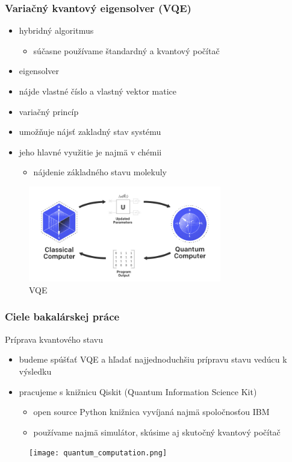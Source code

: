 \documentclass{beamer}
\begin{document}
\begin{frame}
	\frametitle{Variačný kvantový eigensolver (VQE)}
	\begin{itemize}
		\item hybridný algoritmus
		      \begin {itemize}
		\item súčasne používame štandardný a kvantový počítač
	\end{itemize}
	\item eigensolver
	\item 	\begin{itemize}
	nájde vlastné číslo a vlastný vektor matice
	\end{itemize}
	\item variačný princíp
	\item \begin{itemize}
	umožňuje nájsť zakladný stav systému
	\end{itemize}
	\item jeho hlavné využitie je najmä v chémii
	\begin{itemize} 
		\item nájdenie základného stavu molekuly
	\end{itemize}
	\end{itemize}
			
	\begin{figure}
		\centering
		\includegraphics[width=0.75\textwidth]{vqe.jpeg}
		\caption{VQE}
						            
	\end{figure}
\end{frame}


\begin{frame}
	\frametitle{Ciele bakalárskej práce}
	Príprava kvantového stavu
	\begin{itemize}
		\item budeme spúšťať VQE a hľadať najjednoduchšiu prípravu stavu vedúcu k výsledku
		\item pracujeme s knižnicu Qiskit (Quantum Information Science Kit)
		      \begin{itemize}
		      	\item open source Python knižnica vyvíjaná najmä spoločnosťou IBM
		      	\item používame najmä simulátor, skúsime aj skutočný kvantový počítač
		      \end{itemize}
	\end{itemize}
	\begin{figure}
		\centering
		\texttt{[image: quantum\_computation.png]}
	\end{figure}
\end{frame}
\end{document}
